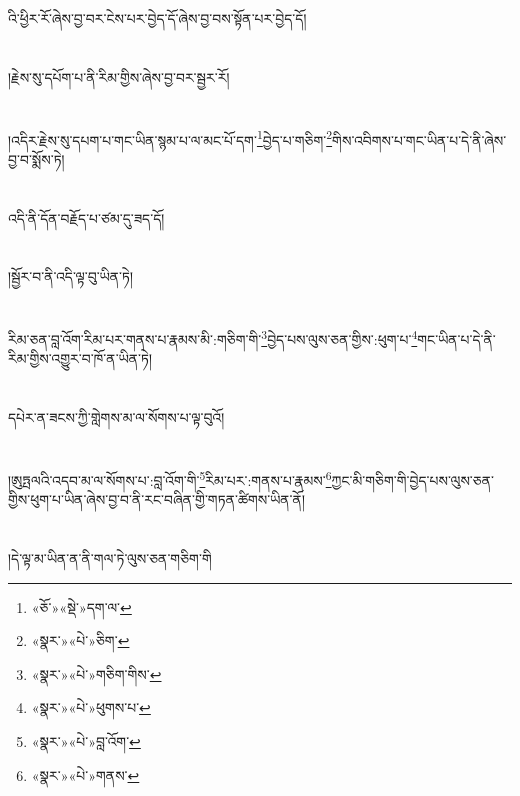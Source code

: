 འི་ཕྱིར་རོ་ཞེས་བྱ་བར་ངེས་པར་བྱེད་དོ་ཞེས་བྱ་བས་སྟོན་པར་བྱེད་དོ།\chapter{ }།རྗེས་སུ་དཔོག་པ་ནི་རིམ་གྱིས་ཞེས་བྱ་བར་སྦྱར་རོ།\chapter{ }།འདིར་རྗེས་སུ་དཔག་པ་གང་ཡིན་སྙམ་པ་ལ་མང་པོ་དག་\footnote{«ཅོ་»«སྡེ་»དག་ལ་}བྱེད་པ་གཅིག་\footnote{«སྣར་»«པེ་»ཅིག་}གིས་འབིགས་པ་གང་ཡིན་པ་དེ་ནི་ཞེས་བྱ་བ་སྨོས་ཏེ།\chapter{ }འདི་ནི་དོན་བརྗོད་པ་ཙམ་དུ་ཟད་དོ།\chapter{ }།སྦྱོར་བ་ནི་འདི་ལྟ་བུ་ཡིན་ཏེ།\chapter{ }རིམ་ཅན་བླ་འོག་རིམ་པར་གནས་པ་རྣམས་མི་:གཅིག་གི་\footnote{«སྣར་»«པེ་»གཅིག་གིས་}བྱེད་པས་ལུས་ཅན་གྱིས་:ཕུག་པ་\footnote{«སྣར་»«པེ་»ཕུགས་པ་}གང་ཡིན་པ་དེ་ནི་རིམ་གྱིས་འགྱུར་བ་ཁོ་ན་ཡིན་ཏེ།\chapter{ }དཔེར་ན་ཟངས་ཀྱི་གླེགས་མ་ལ་སོགས་པ་ལྟ་བུའོ།\chapter{ }།ཨུཏྤལའི་འདབ་མ་ལ་སོགས་པ་:བླ་འོག་གི་\footnote{«སྣར་»«པེ་»བླ་འོག་}རིམ་པར་:གནས་པ་རྣམས་\footnote{«སྣར་»«པེ་»གནས་}ཀྱང་མི་གཅིག་གི་བྱེད་པས་ལུས་ཅན་གྱིས་ཕུག་པ་ཡིན་ཞེས་བྱ་བ་ནི་རང་བཞིན་གྱི་གཏན་ཚིགས་ཡིན་ནོ།\chapter{ }།དེ་ལྟ་མ་ཡིན་ན་ནི་གལ་ཏེ་ལུས་ཅན་གཅིག་གི